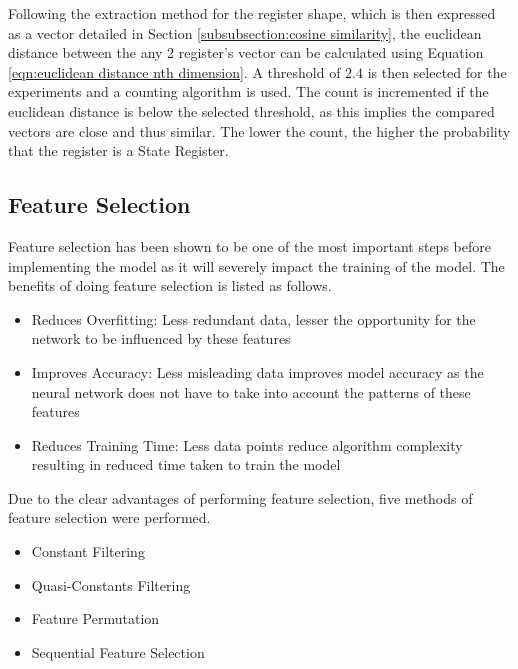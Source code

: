 \documentclass{tum-book}
\begin{document}
            \bigskip\noindent
            Following the extraction method for the register shape, which is then expressed as a vector detailed in Section \ref{subsubsection:cosine similarity}, the euclidean distance between the any 2 register's vector can be calculated using Equation \ref{eqn:euclidean distance nth dimension}. A threshold of $2.4$ is then selected for the experiments and a counting algorithm is used. The count is incremented if the euclidean distance is below the selected threshold, as this implies the compared vectors are close and thus similar. The lower the count, the higher the probability that the register is a State Register.

        \newpage\subsection{Feature Selection}\label{subsection:features selection}
        Feature selection has been shown to be one of the most important steps before implementing the model as it will severely impact the training of the model. The benefits of doing feature selection is listed as follows\cite{feature_selection}.
        
            \begin{itemize}
                \item Reduces Overfitting: Less redundant data, lesser the opportunity for the network to be influenced by these features 
                \item Improves Accuracy: Less misleading data improves model accuracy as the neural network does not have to take into account the patterns of these features
                \item Reduces Training Time: Less data points reduce algorithm complexity resulting in reduced time taken to train the model
            \end{itemize}
            
            \bigskip\noindent 
            Due to the clear advantages of performing feature selection, five methods of feature selection were performed.
            \begin{itemize}
                \item Constant Filtering
                \item Quasi-Constants Filtering
                \item Feature Permutation
                \item Sequential Feature Selection 
            \end{itemize}
\end{document}

